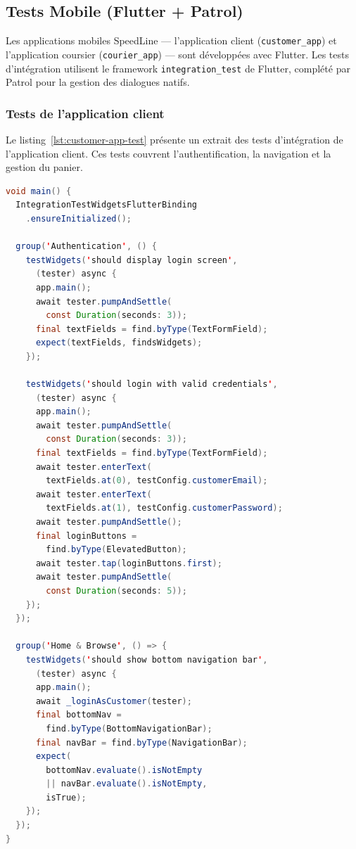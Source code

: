 \subsection{Tests Mobile (Flutter + Patrol)}
\label{subsec:tests-mobile}

Les applications mobiles SpeedLine --- l'application client (\texttt{customer\_app})
et l'application coursier (\texttt{courier\_app}) --- sont développées avec Flutter.
Les tests d'intégration utilisent le framework \texttt{integration\_test} de Flutter,
complété par Patrol pour la gestion des dialogues natifs.

\subsubsection{Tests de l'application client}

Le listing~\ref{lst:customer-app-test} présente un extrait des tests d'intégration
de l'application client. Ces tests couvrent l'authentification, la navigation et
la gestion du panier.

\begin{lstlisting}[language=Java, caption={Tests d'intégration -- customer\_app/app\_test.dart}, label={lst:customer-app-test}]
void main() {
  IntegrationTestWidgetsFlutterBinding
    .ensureInitialized();

  group('Authentication', () {
    testWidgets('should display login screen',
      (tester) async {
      app.main();
      await tester.pumpAndSettle(
        const Duration(seconds: 3));
      final textFields = find.byType(TextFormField);
      expect(textFields, findsWidgets);
    });

    testWidgets('should login with valid credentials',
      (tester) async {
      app.main();
      await tester.pumpAndSettle(
        const Duration(seconds: 3));
      final textFields = find.byType(TextFormField);
      await tester.enterText(
        textFields.at(0), testConfig.customerEmail);
      await tester.enterText(
        textFields.at(1), testConfig.customerPassword);
      await tester.pumpAndSettle();
      final loginButtons =
        find.byType(ElevatedButton);
      await tester.tap(loginButtons.first);
      await tester.pumpAndSettle(
        const Duration(seconds: 5));
    });
  });

  group('Home & Browse', () => {
    testWidgets('should show bottom navigation bar',
      (tester) async {
      app.main();
      await _loginAsCustomer(tester);
      final bottomNav =
        find.byType(BottomNavigationBar);
      final navBar = find.byType(NavigationBar);
      expect(
        bottomNav.evaluate().isNotEmpty
        || navBar.evaluate().isNotEmpty,
        isTrue);
    });
  });
}
\end{lstlisting}

